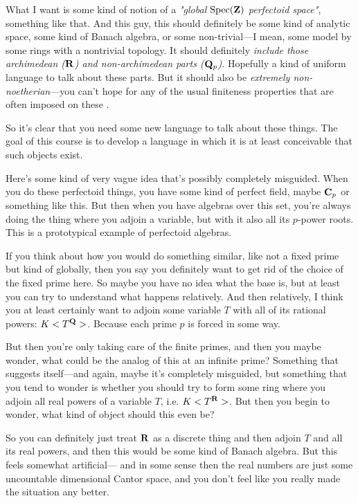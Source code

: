 What I want is some kind of notion of a \emph{"global $\operatorname{Spec}(\mathbf Z)$ perfectoid space"}, something like that. And this guy, this should definitely be some kind of analytic space, some kind of Banach algebra, or some non-trivial---I mean, some model by some rings with a nontrivial topology. 
It should definitely \emph{include those archimedean ($\mathbf R$) and non-archimedean parts ($\mathbf Q_p$)}. Hopefully a kind of uniform language to talk about these parts. But it should also be \emph{extremely non-noetherian}---you can't hope for any of the usual finiteness properties that are often imposed on these .

So it's clear that you need some new language to talk about these things. The goal of this course is to develop a language in which it is at least conceivable that such objects exist.

Here's some kind of very vague idea that's possibly completely misguided. When you do these perfectoid things, you have some kind of perfect field, maybe $\mathbf C_p$ or something like this. But then when you have algebras over this set, you're always doing the thing where you adjoin a variable, but with it also all its $p$-power roots. This is a prototypical example of perfectoid algebras.


If you think about how you would do something similar, like not  a fixed prime but kind of globally, then you say you definitely want to get rid of the choice of the fixed prime here. So maybe you have no idea what the base is, but at least you can try to understand what happens relatively. And then relatively, I think you at least certainly want to adjoin some variable $T$ with all of its rational powers: $K<T^{\mathbf Q}>$. Because each prime $p$ is forced in some way. 

But then you're only taking care of the finite primes, and then you maybe wonder, what could be the analog of this at an infinite prime? Something that suggests itself---and again, maybe it's completely misguided, but something that you tend to wonder is whether you should try to form some ring where you adjoin all real powers of a variable $T$, i.e. $K<T^{\mathbf R}>$. But then you begin to wonder, what kind of object should this even be?

So you can definitely just treat $\mathbf R$ as a discrete thing and then adjoin $T$ and all its real powers, and then this would be some kind of Banach algebra. But this feels somewhat artificial--- and in some sense then the real numbers are just some uncountable dimensional Cantor space, and you don't feel like you really made the situation any better.

